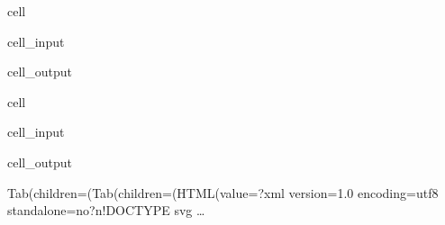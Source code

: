 \documentclass[letterpaper,10pt,english]{jupyterBook}
\begin{document}
\begin{sphinxuseclass}{cell}\begin{sphinxVerbatimInput}

\begin{sphinxuseclass}{cell_input}
\begin{sphinxVerbatim}[commandchars=\\\{\}]
\end{sphinxVerbatim}

\end{sphinxuseclass}\end{sphinxVerbatimInput}
\begin{sphinxVerbatimOutput}

\begin{sphinxuseclass}{cell_output}
\begin{sphinxVerbatim}[commandchars=\\\{\}]
[]
\end{sphinxVerbatim}

\end{sphinxuseclass}\end{sphinxVerbatimOutput}

\end{sphinxuseclass}
\begin{sphinxuseclass}{cell}\begin{sphinxVerbatimInput}

\begin{sphinxuseclass}{cell_input}
\begin{sphinxVerbatim}[commandchars=\\\{\}]
\PYG{p}{[}\PYG{p}{]}
\end{sphinxVerbatim}

\end{sphinxuseclass}\end{sphinxVerbatimInput}
\begin{sphinxVerbatimOutput}

\begin{sphinxuseclass}{cell_output}
\begin{sphinxVerbatim}[commandchars=\\\{\}]
Tab(children=(Tab(children=(HTML(value=\PYGZsq{}\PYGZlt{}?xml version=\PYGZdq{}1.0\PYGZdq{} encoding=\PYGZdq{}utf\PYGZhy{}8\PYGZdq{} standalone=\PYGZdq{}no\PYGZdq{}?\PYGZgt{}\PYGZbs{}n\PYGZlt{}!DOCTYPE svg …
\end{sphinxVerbatim}

\begin{sphinxVerbatim}[commandchars=\\\{\}]

\end{sphinxVerbatim}

\end{sphinxuseclass}\end{sphinxVerbatimOutput}

\end{sphinxuseclass}
\end{document}
